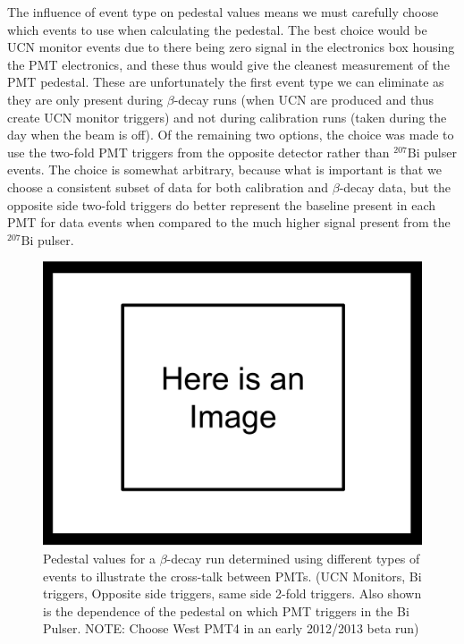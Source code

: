 The influence of event type on pedestal values means we must carefully choose which events
to use when calculating the pedestal.
The best choice would be UCN monitor events due to there being zero signal 
in the electronics box housing the PMT electronics, and these thus would give
the cleanest measurement of the PMT pedestal.
These are unfortunately the first event type we can eliminate as they are only present
during $\beta$-decay runs (when UCN are produced and thus create UCN monitor triggers)
and not during calibration runs (taken during the day when the beam is off). 
Of the remaining two options, the choice was made to use the
two-fold PMT triggers from the opposite detector rather than $^{207}\mathrm{Bi}$ pulser
events. The choice is somewhat arbitrary, because what is important is that we choose
a consistent subset of data for both calibration and $\beta$-decay data, but the
opposite side two-fold triggers do better represent the baseline present in each PMT
for data events when compared to the much higher signal present from the $^{207}\mathrm{Bi}$
pulser.


\iffalse
\begin{figure}[h] 
\centering
\includegraphics[scale=.25]{3-UCNAAnalysis/ImageHolder.pdf}
\caption{Pedestal values for a $\beta$-decay run determined using different 
types of events to illustrate the cross-talk between PMTs. (UCN Monitors, 
Bi triggers, Opposite side triggers, same side 2-fold triggers. Also shown 
is the dependence of the pedestal on which PMT triggers in the Bi Pulser. NOTE:
Choose West PMT4 in an early 2012/2013 beta run) }
\label{fig:peds_types}
\end{figure}


